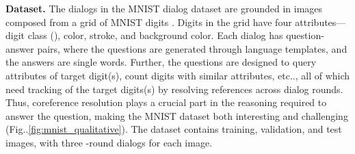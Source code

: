 \documentclass[runningheads]{llncs}
\makeatletter
\DeclareRobustCommand\onedot{\futurelet\@let@token\@onedot}
\def\@onedot{\ifx\@let@token.\else.\null\fi\xspace}
\def\etc{etc\onedot} \def\vs{vs\onedot}
\def\Fig{Fig\onedot}
\def\vs{vs\onedot}
\makeatother
\begin{document}
\noindent
\textbf{Dataset.}
The dialogs in the MNIST dialog dataset \cite{paul2017visual} are grounded in
images composed from a  grid of MNIST digits \cite{lecun-mnisthandwrittendigit-2010}.
Digits in the grid have four attributes---digit class (), 
color, stroke, and background color.
Each dialog has  question-answer pairs, where the questions are
generated through language templates, and the answers are single words.
Further, the questions are designed to query attributes of target digit(s),
count digits with similar attributes, \etc, all of which need tracking of the
target digits(s) by resolving references across dialog rounds.
Thus, coreference resolution plays a crucial part in the reasoning required to
answer the question, making the MNIST dataset both interesting and challenging
(\Fig\ref{fig:mnist_qualitative}).
The dataset contains  training,  validation, and  test images,
with three -round dialogs for each image.
\end{document}
